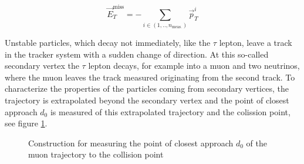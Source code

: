 \begin{equation}
	\label{eq:eq_2_6}
	\vec{E}_{T}^{\text{miss}} = - \sum_{i \in (1, .., n_{\text{meas.}})} \vec{p}_{T}^{i} 
\end{equation}

Unstable particles, which decay not immediately, like the $\tau$ lepton, leave a track in the tracker system with a sudden change of direction. At this so-called secondary vertex the $\tau$ lepton decays, for example into a muon and two neutrinos, where the muon leaves the track measured originating from the second track. To characterize the properties of the particles coming from secondary vertices, the trajectory is extrapolated beyond the secondary vertex and the point of closest approach $d_{0}$ is measured of this extrapolated trajectory and the colission point, see figure \ref{fig:fig_2_11}.

\begin{figure}[ht]
	\centering
	\caption[Construction of point of closest approach]{Construction for measuring the point of closest approach $d_{0}$ of the muon trajectory to the collision point}
	\label{fig:fig_2_11}
\end{figure}


